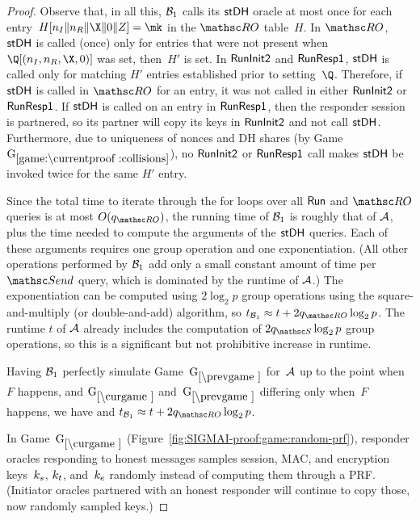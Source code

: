 \begin{proof}
Observe that, in all this, $\mathcal{B}_1$ calls its $\mathsf{stDH}$ oracle at most once for each entry~$H[\nonce_I \conc \nonce_R \conc \X \conc \Y \conc \Zz] = \mk$ in the $\RO$ table~$H$. 
In $\RO$, $\mathsf{stDH}$ is called (once) only for entries that were not present when $\Q[(\nonce_I, \nonce_R, \X, \Y)]$ was set, then~$H'$ is set.
In $\mathsf{RunInit2}$ and $\mathsf{RunResp1}$, $\mathsf{stDH}$ is called only for matching $H'$ entries established prior to setting~$\Q$.
Therefore, if $\mathsf{stDH}$ is called in $\RO$ for an entry, it was not called in either $\mathsf{RunInit2}$ or $\mathsf{RunResp1}$. 
If $\mathsf{stDH}$ is called on an entry in $\mathsf{RunResp1}$, then the responder session is partnered, so its partner will copy its keys in $\mathsf{RunInit2}$ and not call $\mathsf{stDH}$. Furthermore, due to uniqueness of nonces and DH shares (by Game~$\lblGm{collisions}$), no $\mathsf{RunInit2}$ or $\mathsf{RunResp1}$ call makes $\mathsf{stDH}$ be invoked twice for the same $H'$ entry. 

Since the total time to iterate through the for loops over all $\mathsf{Run}$ and $\RO$ queries is at most $O(\qRO)$, the running time of $\mathcal{B}_1$ is roughly that of $\mathcal{A}$, plus the time needed to compute the arguments of the $\mathsf{stDH}$ queries. 
Each of these arguments requires one group operation and one exponentiation. (All other operations performed by $\mathcal{B}_1$ add only a small constant amount of time per $\Send$ query, which is dominated by the runtime of $\mathcal{A}$.) The exponentiation can be computed using $2\log_2 p$ group operations using the square-and-multiply (or double-and-add) algorithm, so $t_{\advB_1} \approx t + 2\qRO\log_2 p$. The runtime $t$ of $\mathcal{A}$ already includes the computation of $2\qSend\log_2 p$ group operations, so this is a significant but not prohibitive increase in runtime.

Having $\mathcal{B}_1$ perfectly simulate Game~$\prevGm$ for~$\mathcal{A}$ up to the point when~$F$ happens,
and $\curGm$ and~$\prevGm$ differing only when~$F$ happens,
we have
and $t_{\advB_1} \approx t+2\qRO \log_2 p$. 



In Game~$\curGm$ (Figure~\ref{fig:SIGMAI-proof:game:random-prf}\iffull{}\fi), responder oracles responding to honest messages samples session, MAC, and encryption keys~$k_s$, $k_t$, and~$k_e$ randomly instead of computing them through a PRF.
(Initiator oracles partnered with an honest responder will continue to copy those, now randomly sampled keys.)


\end{proof}
